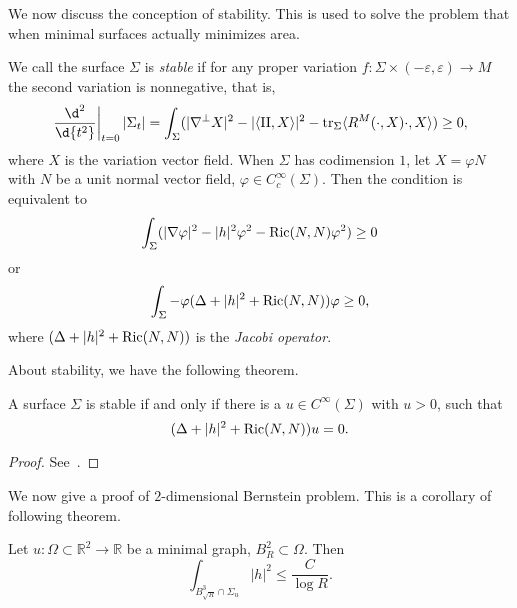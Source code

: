 We now discuss the conception of stability.
This is used to solve the problem that when minimal surfaces actually minimizes area.
\begin{defn}[Stability]
    We call the surface $\Sigma$ is \emph{stable} if for any proper variation $f:\Sigma\times(-\varepsilon,\varepsilon)\to M$ the second variation is nonnegative, that is,
    \[\left.\frac{\d^2{}}{\d{t^2}}\right|_{t=0}|\Sigma_t|=\int_\Sigma(|\nabla^\perp X|^2-|\langle\II,X\rangle|^2-\tr_\Sigma\langle R^M(\cdot,X)\cdot,X\rangle)\geq 0,\]
    where $X$ is the variation vector field.
    When $\Sigma$ has codimension $1$, let $X=\varphi N$ with $N$ be a unit normal vector field, $\varphi\in C^\infty_c(\Sigma)$.
    Then the condition is equivalent to
    \[\int_\Sigma(|\nabla\varphi|^2-|h|^2\varphi^2-\operatorname{Ric}(N,N)\varphi^2)\geq 0\]
    or
    \[\int_\Sigma-\varphi(\Delta+|h|^2+\operatorname{Ric}(N,N))\varphi\geq 0,\]
    where $(\Delta+|h|^2+\operatorname{Ric}(N,N))$ is the \emph{Jacobi operator}.
\end{defn}

About stability, we have the following theorem.
\begin{thm}
    A surface $\Sigma$ is stable if and only if there is a $u\in C^\infty(\Sigma)$ with $u>0$, such that
    \[(\Delta+|h|^2+\operatorname{Ric}(N,N))u=0.\]
\end{thm}
\begin{proof}
    See~\cite{Fischer-Colbrie-Schoen}.
\end{proof}

We now give a proof of $2$-dimensional Bernstein problem.
This is a corollary of following theorem.
\begin{thm}\label{prebernstein}
    Let $u:\Omega\subset\mathbb{R}^2\to\mathbb{R}$ be a minimal graph, $B^2_R\subset\Omega$.
    Then
    \[\int_{B^3_{\sqrt{R}}\cap\Sigma_u}|h|^2\leq\frac{C}{\log{R}}.\]
\end{thm}

